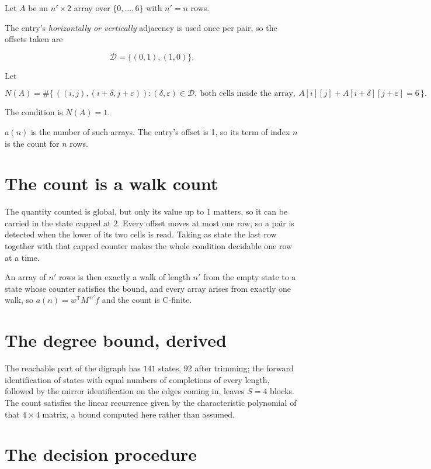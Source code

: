\documentclass[11pt]{article}
\theoremstyle{definition}
\begin{document}
Let $A$ be an $n' \times 2$ array over $\{0,\dots,6\}$ with $n' = n$ rows.

The entry's {\itshape horizontally or vertically} adjacency is used once per pair, so the offsets taken are

\[\mathcal{D} = \{(0,1), (1,0)\}.\]

Let

\[N(A) = \#\bigl\{\,((i,j),(i{+}\delta,j{+}\varepsilon)) : (\delta,\varepsilon) \in \mathcal{D},\ \text{both cells inside the array},\ A[i][j] + A[i{+}\delta][j{+}\varepsilon] = 6\,\bigr\}.\]

The condition is $N(A) = 1$.

$a(n)$ is the number of such arrays. The entry's offset is 1, so its term of index $n$ is the count for $n$ rows.

\section{The count is a walk count}

The quantity counted is global, but only its value up to $1$ matters, so it can be carried in the state capped at $2$. Every offset moves at most one row, so a pair is detected when the lower of its two cells is read. Taking as state the last row together with that capped counter makes the whole condition decidable one row at a time.

An array of $n'$ rows is then exactly a walk of length $n'$ from the empty state to a state whose counter satisfies the bound, and every array arises from exactly one walk, so $a(n) = w^{\mathsf T}M^{\,n'}f$ and the count is C-finite.

\section{The degree bound, derived}

The reachable part of the digraph has $141$ states, $92$ after trimming; the forward identification of states with equal numbers of completions of every length, followed by the mirror identification on the edges coming in, leaves $S = 4$ blocks. The count satisfies the linear recurrence given by the characteristic polynomial of that $4\times4$ matrix, a bound computed here rather than assumed.

\section{The decision procedure}
\end{document}
